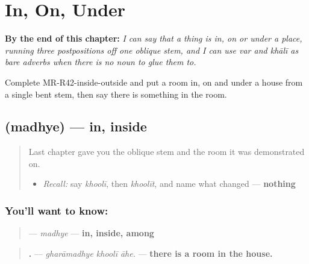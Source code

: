 
\chapter{In, On, Under}
\label{ch:mr-in-on-under}

\begin{chapteropening}
\textbf{By the end of this chapter:} \emph{I can say that a thing is in, on or under a place, running three postpositions off one oblique stem, and I can use var and khālī as bare adverbs when there is no noun to glue them to.}

Complete MR-R42-inside-outside and put a room in, on and under a house from a single bent stem, then say there is something in the room.
\end{chapteropening}

\section[\texorpdfstring{\mr{मध्ये} (madhye)}{मध्ये (madhye)}]{ (madhye) — in, inside}

\label{lesson:MR-C42-madhye}



\begin{quote}
Last chapter gave you the oblique stem and the room it was demonstrated on.

\begin{itemize}
\raggedright
  \item \emph{Recall:} say \emph{khoolī}, then \emph{khoolīt}, and name what changed — \textbf{nothing}
\end{itemize}
\end{quote}

\subsection*{You'll want to know: }
\begin{quote}
\textbf{} — \emph{madhye} — \textbf{in, inside, among}
\end{quote}

\begin{quote}
\textbf{  .} — \emph{gharāmadhye khoolī āhe.} — \textbf{there is a room in the house.}
\end{quote}

